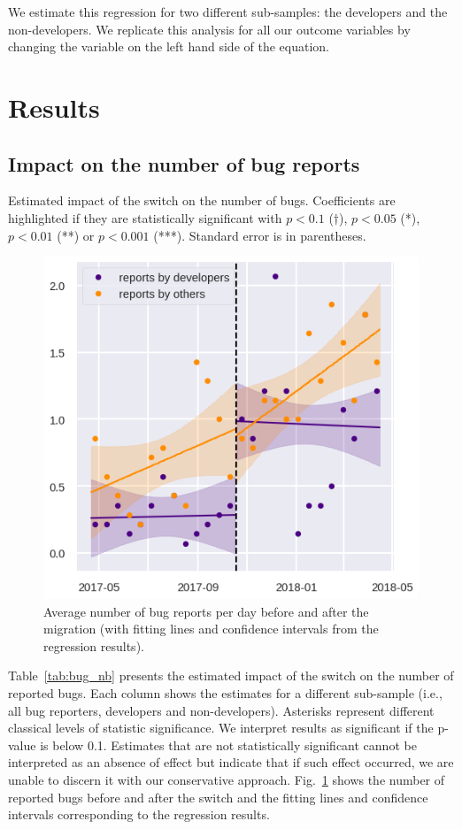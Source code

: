 \documentclass[conference]{IEEEtran}
\begin{document}
We estimate this regression for two different sub-samples: the developers and the non-developers. We replicate this analysis for all our outcome variables by changing the variable on the left hand side of the equation. 

\section{Results}
\label{results}
\subsection{Impact on the number of bug reports}

\begin{table}
\centering
\caption{Estimated impact of the switch on the number of bugs. Coefficients are highlighted if they are statistically significant with $p<0.1$ ($\dagger$), $p<0.05$ (*), $p<0.01$ (**) or $p<0.001$ (***). Standard error is in parentheses.}
\label{tab:bug_nb}

\end{table}

\begin{figure}
\includegraphics{bug_nb_rd.png}
\caption{Average number of bug reports per day before and after the migration (with fitting lines and confidence intervals from the regression results).} \label{bug_nb_rd}
\end{figure}

Table~\ref{tab:bug_nb} presents the estimated impact of the switch on the number of reported bugs. Each column shows the estimates for a different sub-sample (i.e., all bug reporters, developers and non-developers). Asterisks represent different classical levels of statistic significance. We interpret results as significant if the p-value is below 0.1. Estimates that are not statistically significant cannot be interpreted as an absence of effect but indicate that if such effect occurred, we are unable to discern it with our conservative approach. Fig.~\ref{bug_nb_rd}  shows the number of reported bugs before and after the switch and the fitting lines and confidence intervals corresponding to the regression results. 
\end{document}
